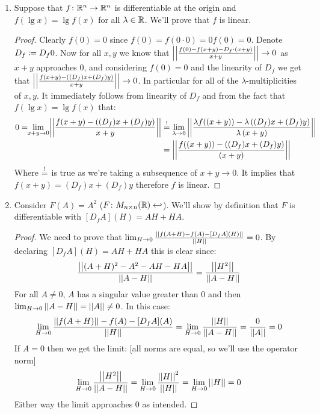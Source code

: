 \documentclass[a4paper]{article}
\begin{document}
\begin{enumerate}
		\item Suppose that $f \co \R^{n} \to \R^{n}$ is differentiable at the origin and $f(\lg x) = \lg f(x)$ for all $\lg \in \R$. We'll prove that $f$ is linear. 
		
		\begin{proof}
			Clearly $f(0) = 0$ since $f(0) = f(0 \cdot 0) = 0 f(0) = 0$. 
			Denote $D_f \cod D_f0$. Now for all $x, y$ we know that $\norm{\frac{f(0) - f(x + y) - D_f \cdot (x + y)}{x + y}} \to 0$ as $x + y$ approaches $0$, and considering $f(0) = 0$ and the linearity of $D_f$ we get that $\norm{\frac{f(x + y) - \cl{(D_f) x + (D_f)y}}{x + y}} \to 0$. In particular for all of the $\lambda$-multiplicities of $x, y$. It immediately follows from linearity of $D_f$ and from the fact that $f(\lg x) = \lg f(x)$ that: 
			\begin{align*}
				0 = \!\!\lim_{x + y \to 0}\!\norm{\frac{f(x + y) - \cl{(D_f) x + (D_f)y}}{x + y}} &\seq \lim_{\lg \to 0}\norm{\frac{\lg f(\cl{x + y}) - \lg \cl{(D_f)x + (D_f)y}}{ \lg\cl{x+ y}}} \\
				&= \norm{\frac{ f(\cl{x + y}) - \cl{(D_f)x + (D_f)y}}{\cl{x+ y}}}
			\end{align*}
			Where $\seq$ is true as we're taking a subsequence of $x + y \to 0$. 
			It implies that $f(x + y) = (D_f)x + (D_f)y$ therefore $f$ is linear. 
		\end{proof}
		
		\item Consider $F(A) = A^{2}$ ($F \co M_{n \times n}(\R) \lin$). We'll show by definition that $F$ is differentiable with $[D_f A](H) = AH + HA$. 
		\begin{proof}
			We need to prove that $\lim_{H \to 0}\frac{\norm{f(A + H) - f(A) - [D_fA](H)}}{\norm{H}} = 0$. By declaring $[D_fA](H) = AH + HA$ this is clear since: 
			\[ \frac{\norm{(A + H)^{2} - A^{2} - AH - HA}}{\norm{A - H}} = \frac{\norm{H^2}}{\norm{A - H}} \]
			For all $A \neq 0$, $A$ has a singular value greater than $0$ and then $\lim_{H\to 0}\norm{A - H} = \norm{A} \neq 0$. In this case: 
			\[ \lim_{H\to 0} \frac{\norm{f(A + H)} - f(A) - [D_fA](A)}{\norm{H}} = \lim_{H \to 0}\frac{\norm{H}}{\norm{A - H}} = \frac{0}{\norm{A}}= 0 \]
			If $A = 0$ then we get the limit: [all norms are equal, so we'll use the operator norm]
			\[ \lim_{H \to 0}\frac{\norm{H^{2}}}{\norm{A - H}} = \lim_{H \to 0}\frac{\norm{H}^{2}}{\norm{H}} = \lim_{H\to 0}\norm{H} = 0 \]
			Either way the limit approaches $0$ as intended. 
		\end{proof}
	\end{enumerate}
	
\end{document}
